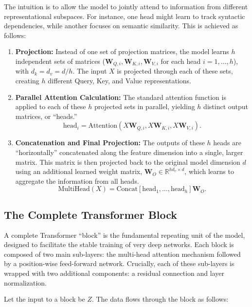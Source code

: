 \documentclass[%
  reprint,
  superscriptaddress,
  showpacs,
  showkeys,
  amsmath,amssymb,
  pra,
  longbibliography,
  floatfix,
  x11names
]{revtex4-2}
\begin{document}
The intuition is to allow the model to jointly attend to information from different representational subspaces.
For instance, one head might learn to track syntactic dependencies, while another focuses on semantic similarity.
This is achieved as follows:
\begin{enumerate}
    \item \textbf{Projection:} Instead of one set of projection matrices, the model learns $h$ independent sets of matrices
($\bm{W}_{Q,i}, \bm{W}_{K,i}, \bm{W}_{V,i}$ for each head $i=1,\dots,h$), with  $d_k = d_v = d / h$.
The input $X$ is projected through each of these sets, creating $h$ different Query, Key, and Value representations.
    \item \textbf{Parallel Attention Calculation:} The standard attention function is applied to each of these $h$
projected sets in parallel, yielding $h$ distinct output matrices, or ``heads.''
        \begin{equation}
            \text{head}_i = \text{Attention}(X\bm{W}_{Q,i}, X\bm{W}_{K,i}, X\bm{W}_{V,i}).
        \end{equation}
    \item \textbf{Concatenation and Final Projection:} The outputs of these $h$ heads are ``horizontally''
concatenated along the feature dimension into a single, larger matrix.
This matrix is then projected back to the original model dimension $d$ using an additional learned weight matrix,
$\bm{W}_O \in \mathbb{R}^{h d_v \times d}$, which learns to aggregate the information from all heads.
        \begin{equation}
            \text{MultiHead}(X) = \text{Concat}[\text{head}_1, \dots, \text{head}_h] \bm{W}_O.
        \end{equation}
\end{enumerate}

\subsection{The Complete Transformer Block}
A complete Transformer ``block'' is the fundamental repeating unit of the model, designed to facilitate the stable training of very deep networks. Each block is composed of two main sub-layers: the multi-head attention mechanism followed by a position-wise feed-forward network. Crucially, each of these sub-layers is wrapped with two additional components: a residual connection and layer normalization.

Let the input to a block be $Z$. The data flows through the block as follows:
\end{document}
